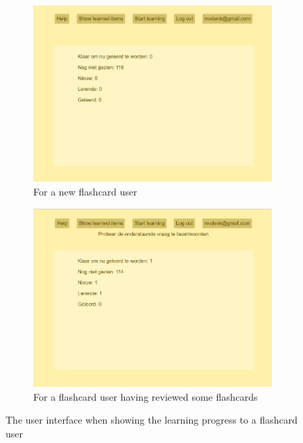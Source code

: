 \begin{figure}
    \begin{subfigure}{0.4\textwidth}
        \centering
        \includegraphics[width=.8\textwidth]{img/ui_fc_learnprogress_1.png}
        \caption{For a new flashcard user}
        \label{fig:ui_fc_learnprogress_1}
    \end{subfigure}
    \qquad
    \begin{subfigure}{0.4\textwidth}
        \centering
        \includegraphics[width=.8\textwidth]{img/ui_fc_learnprogress_2.png}
        \caption{For a flashcard user having reviewed some flashcards}
        \label{fig:ui_fc_learnprogress_2}
    \end{subfigure}
    \caption{The user interface when showing the learning progress to a flashcard user}
    \label{fig:ui_fc_learnprogress}
\end{figure}

